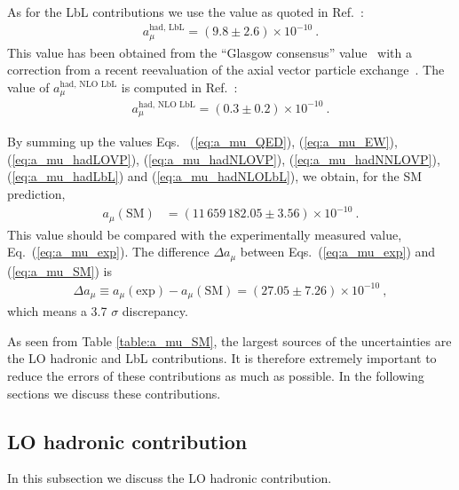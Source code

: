 As for the LbL contributions we use the value
as quoted in Ref.~\cite{KNT18}: 
%
%
\begin{align}
a_\mu^{\text{had, LbL}}= (9.8 \pm 2.6) \times 10^{-10}~.
\label{eq:a_mu_hadLbL}
\end{align}
%
This value has been obtained from the ``Glasgow consensus''
value~\cite{Prades:2009tw} with a correction from a recent reevaluation
of the axial vector particle exchange~\cite{Jegerlehner:2015stw,Pauk:2014rta}.
The value of $a_\mu^{\text{had, NLO LbL}}$ is computed
in Ref.~\cite{Colangelo-etal-NLOLbL}:
%
\begin{align}
a_\mu^{\text{had, NLO LbL}}= (0.3 \pm 0.2) \times 10^{-10}~.
\label{eq:a_mu_hadNLOLbL}
\end{align}

By summing up the values Eqs.~
(\ref{eq:a_mu_QED}), (\ref{eq:a_mu_EW}), (\ref{eq:a_mu_hadLOVP}),
(\ref{eq:a_mu_hadNLOVP}), (\ref{eq:a_mu_hadNNLOVP}),
(\ref{eq:a_mu_hadLbL}) and (\ref{eq:a_mu_hadNLOLbL}), 
we obtain, for the SM prediction, 
%
\begin{align}
 a_\mu(\text{SM}) &= (11 \, 659 \, 182.05 \pm 3.56) \times 10^{-10}~.
\label{eq:a_mu_SM}
\end{align}
%
This value should be compared with the experimentally measured
value, Eq.~(\ref{eq:a_mu_exp}).
The difference $\Delta a_\mu$ between Eqs.~(\ref{eq:a_mu_exp})
and (\ref{eq:a_mu_SM}) is
% 
\begin{align}
 \Delta a_\mu \equiv a_\mu(\text{exp}) - a_\mu(\text{SM})
= (27.05 \pm 7.26) \times 10^{-10}~,
\label{eq:delta_a_mu}
\end{align}
%
which means a 3.7 $\sigma$ discrepancy.

As seen from Table \ref{table:a_mu_SM}, 
the largest sources of the uncertainties are the
LO hadronic and LbL contributions.  It is therefore
extremely important to reduce the errors of these contributions
as much as possible.
In the following sections we discuss these contributions.

\subsection{LO hadronic contribution}

In this subsection we discuss the LO hadronic contribution.

